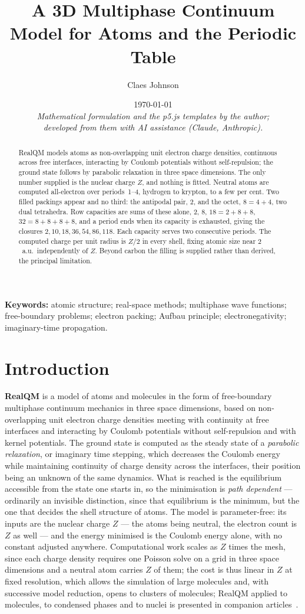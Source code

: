 \documentclass[11pt]{article}
\title{A 3D Multiphase Continuum Model for Atoms and the Periodic Table}
\author[1]{Claes Johnson}
\affil[1]{KTH Royal Institute of Technology, Stockholm, Sweden \\
\texttt{claesjohnson@gmail.com}}
\date{\today \\[0.4em]
\small\textit{Mathematical formulation and the p5.js templates by the author;} \\
\small\textit{developed from them with AI assistance (Claude, Anthropic).}}
\begin{document}
\maketitle

\begin{abstract}
RealQM models atoms as non-overlapping unit electron charge densities, continuous across free
interfaces, interacting by Coulomb potentials without self-repulsion; the ground state follows by
parabolic relaxation in three space dimensions. The only number supplied is the nuclear charge $Z$,
and nothing is fitted. Neutral atoms are computed all-electron over periods~1--4, hydrogen to krypton, to a few
per cent. Two filled packings appear and no third: the antipodal pair, $2$, and the octet, $8=4{+}4$, two
dual tetrahedra. Row capacities are sums of these alone, $2$, $8$, $18=2{+}8{+}8$,
$32=8{+}8{+}8{+}8$, and a period ends when its capacity is exhausted, giving the closures
$2,10,18,36,54,86,118$. Each capacity serves two consecutive periods. The computed
charge per unit radius is $Z/2$ in every shell, fixing atomic size near $2$~a.u.\ independently of
$Z$. Beyond carbon the filling is supplied rather than derived, the principal limitation.
\end{abstract}

\medskip
\noindent\textbf{Keywords:} atomic structure; real-space methods; multiphase wave
functions; free-boundary problems; electron packing; Aufbau principle;
electronegativity; imaginary-time propagation.

\section{Introduction}\label{sec:intro}

\textbf{RealQM} is a model of atoms and molecules in the form of free-boundary multiphase
continuum mechanics in three space dimensions, based on non-overlapping unit electron charge
densities meeting with continuity at free interfaces and interacting by Coulomb potentials
without self-repulsion and with kernel potentials. The ground
state is computed as the steady state of a \emph{parabolic relaxation}, or imaginary time
stepping, which decreases the Coulomb energy while maintaining continuity of charge density
across the interfaces, their position being an unknown of the same dynamics. What is reached is the equilibrium accessible from the
state one starts in, so the minimisation is \emph{path dependent} --- ordinarily an invisible
distinction, since that equilibrium is the minimum, but the one that decides the shell structure of atoms. The model is parameter-free: its inputs are the
nuclear charge $Z$ --- the atoms being neutral, the electron count is $Z$ as well --- and the energy
minimised is the Coulomb energy alone, with no constant adjusted anywhere. Computational work scales as
$Z$ times the mesh, since each charge density requires one Poisson solve on a grid in three space
dimensions and a neutral atom carries $Z$ of them; the cost is thus linear in $Z$ at fixed
resolution,
which allows the simulation of large molecules and, with successive model reduction, opens to
clusters of molecules; RealQM applied to molecules, to condensed phases and to nuclei is
presented in companion articles~\cite{Johnson-RealQM}.
\end{document}
